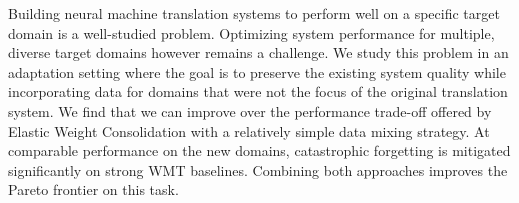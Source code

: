 Building neural machine translation systems to perform well on a specific target domain is a well-studied problem. Optimizing system performance for multiple, diverse target domains however remains a challenge. We study this problem in an adaptation setting where the goal is to preserve the existing system quality while incorporating data for domains that were not the focus of the original translation system. We find that we can improve over the performance trade-off offered by Elastic Weight Consolidation with a relatively simple data mixing strategy. At comparable performance on the new domains, catastrophic forgetting is mitigated significantly on strong WMT baselines. Combining both approaches improves the Pareto frontier on this task.
